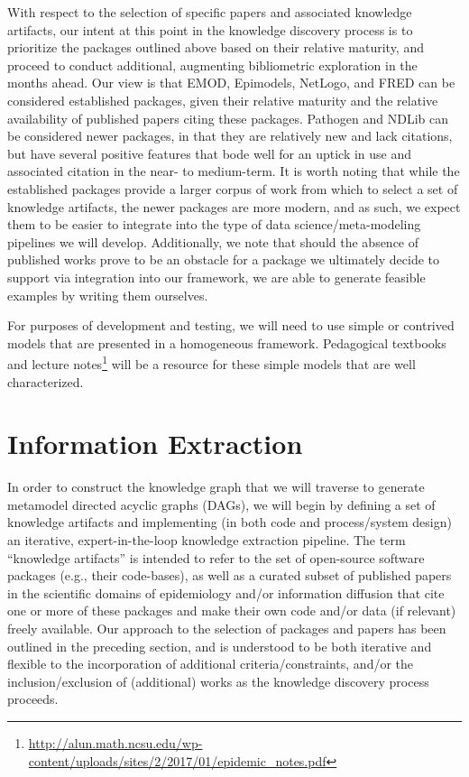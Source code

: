 \documentclass{article}
\begin{document}
With respect to the selection of specific papers and associated knowledge artifacts, our intent at this point in the knowledge discovery process is to prioritize the packages outlined above based on their relative maturity, and proceed to conduct additional, augmenting bibliometric exploration in the months ahead. Our view is that EMOD, Epimodels, NetLogo, and FRED can be considered established packages, given their relative maturity and the relative availability of published papers citing these packages. Pathogen and NDLib can be considered newer packages, in that they are relatively new and lack citations, but have several positive features that bode well for an uptick in use and associated citation in the near- to medium-term. It is worth noting that while the established packages provide a larger corpus of work from which to select a set of knowledge artifacts, the newer packages are more modern, and as such, we expect them to be easier to integrate into the type of data science/meta-modeling pipelines we will develop. Additionally, we note that should the absence of published works prove to be an obstacle for a package we ultimately decide to support via integration into our framework, we are able to generate feasible examples by writing them ourselves. 

For purposes of development and testing, we will need to use simple or contrived models that are presented in a homogeneous framework. Pedagogical textbooks~\cite{voit_first_2012} and lecture notes\footnote{\url{http://alun.math.ncsu.edu/wp-content/uploads/sites/2/2017/01/epidemic_notes.pdf}} will be a resource for these simple models that are well characterized.


\section{Information Extraction}

In order to construct the knowledge graph that we will traverse to generate metamodel directed acyclic graphs (DAGs), we will begin by defining a set of knowledge artifacts and implementing (in both code and process/system design) an iterative, expert-in-the-loop knowledge extraction pipeline. The term ``knowledge artifacts'' is intended to refer to the set of open-source software packages (e.g., their code-bases), as well as a curated subset of published papers in the scientific domains of epidemiology and/or information diffusion that cite one or more of these packages and make their own code and/or data (if relevant) freely available. Our approach to the selection of packages and papers has been outlined in the preceding section, and is understood to be both iterative and flexible to the incorporation of additional criteria/constraints, and/or the inclusion/exclusion of (additional) works as the knowledge discovery process proceeds. 
\end{document}
